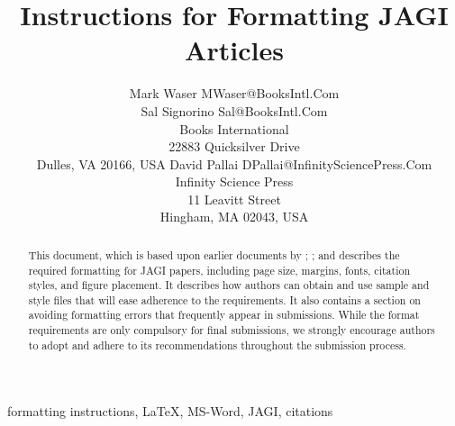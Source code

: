 \documentclass[twoside,11pt]{article}
\begin{document}
\title{Instructions for Formatting JAGI Articles}

\author{\name Mark Waser \email MWaser@BooksIntl.Com \\
       \name Sal Signorino \email Sal@BooksIntl.Com \\
       \addr Books International \\
       22883 Quicksilver Drive \\
       Dulles, VA 20166, USA
       \AND
       \name David Pallai \email DPallai@InfinitySciencePress.Com \\
       \addr Infinity Science Press \\
       11 Leavitt Street \\
       Hingham, MA 02043, USA}


\maketitle

\begin{abstract}
This document, which is based upon earlier documents by \citet{minton:99}; \citet{kaelbling:00}; and \citet{aaai:07} describes the required formatting for JAGI papers, including page size, margins, fonts, citation styles, and figure placement. It describes how authors can obtain and use sample and style files that will ease adherence to the requirements. It also contains a section on avoiding formatting errors that frequently appear in submissions. While the format requirements are only compulsory for final submissions, we strongly encourage authors to adopt and adhere to its recommendations throughout the submission process.
\end{abstract}

\begin{keywords}
  formatting instructions, \LaTeX{}, MS-Word, JAGI, citations
\end{keywords}
\end{document}
